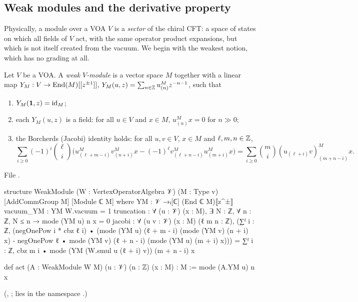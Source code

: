 \subsection{Weak modules and the derivative property}

Physically, a module over a VOA $V$ is a \emph{sector} of the chiral CFT: a space of states on which all fields of
$V$ act, with the same operator product expansions, but which is not itself created from the vacuum. We begin with the
weakest notion, which has no grading at all.

\begin{definition}\label{l12:def:weakmodule}
Let $V$ be a VOA. A \emph{weak $V$-module} is a vector space $M$ together with a linear map
$Y_M:V\to\operatorname{End}(M)[[z^{\pm1}]]$, $Y_M(u,z) = \sum_{n\in{\mathbb{Z}}}u^M_{(n)}z^{-n-1}$, such that
\begin{enumerate}[label=(M\arabic*)]
\item $Y_M(\mathbf{1},z) = \mathrm{id}_M$;
\item each $Y_M(u,z)$ is a field: for all $u\in V$ and $x\in M$, $u^M_{(n)}x = 0$ for $n\gg0$;
\item the Borcherds (Jacobi) identity holds: for all $u,v\in V$, $x\in M$ and $\ell,m,n\in{\mathbb{Z}}$,
\begin{equation*}
 \sum_{i\ge0}(-1)^i\binom\ell i\Big(u^M_{(\ell+m-i)}v^M_{(n+i)}x - (-1)^\ell v^M_{(\ell+n-i)}u^M_{(m+i)}x\Big)
 = \sum_{i\ge0}\binom mi(u_{(\ell+i)}v)^M_{(m+n-i)}x .
\end{equation*}
\end{enumerate}
\end{definition}
\noindent File .
\begin{leancode}
structure WeakModule (W : VertexOperatorAlgebra 𝒱) (M : Type v)
    [AddCommGroup M] [Module ℂ M] where
  YM : 𝒱 →ₗ[ℂ] (End ℂ M)⟦z^±⟧
  vacuum_YM : YM W.vacuum = 1
  truncation : ∀ (u : 𝒱) (x : M), ∃ N : ℤ, ∀ n : ℤ, N ≤ n → mode (YM u) n x = 0
  jacobi : ∀ (u v : 𝒱) (x : M) (ℓ m n : ℤ),
    (∑ᶠ i : ℤ, (negOnePow i * cbz ℓ i) •
        (mode (YM u) (ℓ + m - i) (mode (YM v) (n + i) x)
          - negOnePow ℓ • mode (YM v) (ℓ + n - i) (mode (YM u) (m + i) x)))
      = ∑ᶠ i : ℤ, cbz m i • mode (YM (W.smul u (ℓ + i) v)) (m + n - i) x

def act (A : WeakModule W M) (u : 𝒱) (n : ℤ) (x : M) : M := mode (A.YM u) n x
\end{leancode}
(, ;  lies in the namespace .)

